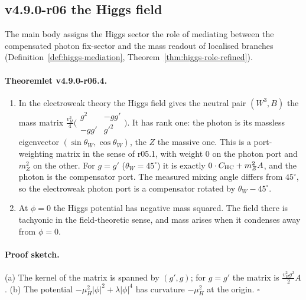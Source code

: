 \subsection*{v4.9.0-r06 the Higgs field}
\label{subsec:v490-r06-higgs}

The main body assigns the Higgs sector the role of mediating between the compensated photon fix-sector and the mass
readout of localised branches (Definition~\ref{def:higgs-mediation}, Theorem~\ref{thm:higgs-role-refined}).

\paragraph{Theoremlet v4.9.0-r06.4.}
\begin{enumerate}[leftmargin=2em]
\item[(a)] In the electroweak theory the Higgs field gives the neutral pair \((W^3,B)\) the mass matrix
\(\tfrac{v_H^2}{4}\bigl(\begin{smallmatrix}g^2&-gg'\\-gg'&g'^2\end{smallmatrix}\bigr)\).  It has rank one: the photon is its massless
eigenvector \((\sin\theta_W,\cos\theta_W)\), the \(Z\) the massive one.  This is a port-weighting matrix in the sense of
r05.1, with weight \(0\) on the photon port and \(m_Z^2\) on the other.  For \(g=g'\) (\(\theta_W=45^\circ\)) it is exactly
\(0\cdot C_{\mathrm{HC}}+m_Z^2A\), and the photon is the compensator port.  The measured mixing angle differs from \(45^\circ\), so the
electroweak photon port is a compensator rotated by \(\theta_W-45^\circ\).
\item[(b)] At \(\phi=0\) the Higgs potential has negative mass squared.  The field there is tachyonic in the
field-theoretic sense, and mass arises when it condenses away from \(\phi=0\).
\end{enumerate}

\paragraph{Proof sketch.}
(a) The kernel of the matrix is spanned by \((g',g)\); for \(g=g'\) the matrix is \(\tfrac{v_H^2g^2}{2}A\).  (b) The
potential \(-\mu_H^2|\phi|^2+\lambda|\phi|^4\) has curvature \(-\mu_H^2\) at the origin.  \(\square\)

